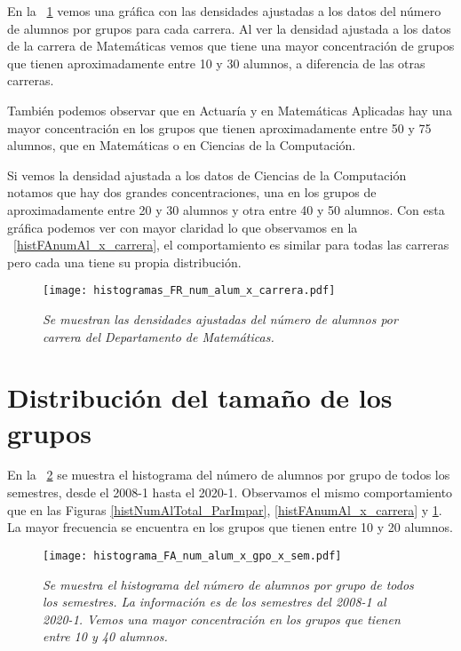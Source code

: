 En la \figurename{~\ref{histFRnumAl_x_carrera}} vemos una gráfica con las densidades ajustadas a los datos del número de alumnos por grupos para cada carrera. Al ver la densidad ajustada a los datos de la carrera de Matemáticas vemos que tiene una mayor concentración de grupos que tienen aproximadamente entre 10 y 30 alumnos, a diferencia de las otras carreras.

También podemos observar que en Actuaría y en Matemáticas Aplicadas hay una mayor concentración en los grupos que tienen aproximadamente entre 50 y 75 alumnos, que en Matemáticas o en Ciencias de la Computación.

Si vemos la densidad ajustada a los datos de Ciencias de la Computación notamos que hay dos grandes concentraciones, una en los grupos de aproximadamente entre 20 y 30 alumnos y otra entre 40 y 50 alumnos. Con esta gráfica podemos ver con mayor claridad lo que observamos en la \figurename{~\ref{histFAnumAl_x_carrera}}, el comportamiento es similar para todas las carreras pero cada una tiene su propia distribución.

\begin{figure}[H]
\centering
\texttt{[image: histogramas\_FR\_num\_alum\_x\_carrera.pdf]} %
\caption[\textit{Densidades del número de alumnos por carrera}]{\textit{Se muestran las densidades ajustadas del número de alumnos por carrera del Departamento de Matemáticas.}}\label{histFRnumAl_x_carrera}
\end{figure}


\section{Distribución del tamaño de los grupos} \label{DitribTamGpos}

En la \figurename{~\ref{histNumAl_x_gpo_x_sem}} se muestra el histograma del número de alumnos por grupo de todos los semestres, desde el 2008-1 hasta el 2020-1. Observamos el mismo comportamiento que en las Figuras \ref{histNumAlTotal_ParImpar}, \ref{histFAnumAl_x_carrera} y \ref{histFRnumAl_x_carrera}. La mayor frecuencia se encuentra en los grupos que tienen entre 10 y 20 alumnos.

\begin{figure}[H]
\centering
\texttt{[image: histograma\_FA\_num\_alum\_x\_gpo\_x\_sem.pdf]} %
\caption[\textit{Histograma del número de alumnos por grupo de todos los semestres}]{\textit{Se muestra el histograma del número de alumnos por grupo de todos los semestres. La información es de los semestres del 2008-1 al 2020-1. Vemos una mayor concentración en los grupos que tienen entre 10 y 40 alumnos.}}\label{histNumAl_x_gpo_x_sem}
\end{figure}

